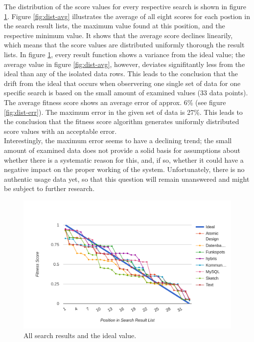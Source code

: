 The distribution of the score values for every respective search is shown in figure \ref{fig:dist-raw}.
Figure \ref{fig:dist-avg} illustrates the average of all eight scores for each postion in the search result lists, the maximum value found at this position, and the respective minimum value.
It shows that the average score declines linearily, which means that the score values are distributed uniformly thorough the result lists. In figure \ref{fig:dist-raw}, every result function shows a variance from the ideal value; the average value in figure \ref{fig:dist-avg}, however, deviates signifitantly less from the ideal than any of the isolated data rows. This leads to the conclusion that the drift from the ideal that occurs when observering one single set of data for one specific search is based on the small amount of examined values (33 data points). The average fitness score shows an average error of approx. 6\% (see figure \ref{fig:dist-err}). The maximum error in the given set of data is 27\%.
This leads to the conclusion that the fitness score algorithm generates uniformly distributed score values with an acceptable error.\\
Interestingly, the maximum error seems to have a declining trend; the small amount of examined data does not provide a solid basis for assumptions about whether there is a systematic reason for this, and, if so, whether it could have a negative impact on the proper working of the system. Unfortunately, there is no authentic usage data yet, so that this question will remain unanswered and might be subject to further research.

\begin{figure}[H]
    \centering
    \includegraphics[width=\textwidth]{images/dist_raw.png}
    \caption[Raw Scores]{All search results and the ideal value.}
    \label{fig:dist-raw}
\end{figure}

